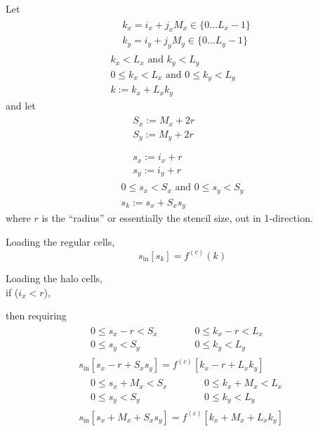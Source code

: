 \documentclass[10pt]{amsart}
\begin{document}
\begin{multicols*}{2}
Let
\[
\begin{gathered}
  \begin{aligned}
    & k_x = i_x + j_x M_x \in \lbrace 0 \dots L_x -1 \rbrace \\ 
    & k_y = i_y + j_y M_y \in \lbrace 0 \dots L_y -1 \rbrace 
    \end{aligned} \\
  k_x < L_x \text{ and } k_y < L_y \\
  0 \leq k_x < L_x \text{ and } 0 \leq k_y < L_y \\
  k := k_x + L_x k_y
\end{gathered}
\]
and let
\[
\begin{gathered}
  \begin{aligned}
    & S_x := M_x + 2r \\ 
    & S_y := M_y + 2r \\
    \end{aligned} \\
  \begin{aligned}
    & s_x := i_x + r \\ 
    & s_y := i_y + r
  \end{aligned} \\
  0 \leq s_x < S_x \text{ and } 0 \leq s_y < S_y \\
  s_k := s_x + S_x s_y 
\end{gathered}
\]
where $r$ is the ``radius'' or essentially the stencil size, out in 1-direction.

Loading the regular cells,
\[
s_{\text{in}}[s_k] = f^{(c)}(k)
\]

Loading the halo cells, \\

if ($i_x < r$),

then requiring
\[
\begin{gathered}
  \begin{aligned}
    & 0 \leq s_x -r < S_x \\ 
    & 0 \leq s_y < S_y
  \end{aligned} \quad \quad \,
  \begin{aligned}
    & 0 \leq k_x - r < L_x \\ 
    & 0 \leq k_y < L_y
    \end{aligned} \\
  s_{\text{in}}[s_x-r + S_xs_y] = f^{(c)}[k_x-r + L_x k_y] \\ 
   \begin{aligned}
    & 0 \leq s_x +M_x < S_x \\ 
    & 0 \leq s_y < S_y
  \end{aligned} \quad \quad \,
  \begin{aligned}
    & 0 \leq k_x + M_x < L_x \\ 
    & 0 \leq k_y < L_y
  \end{aligned} \\
  s_{\text{in}}[s_x + M_x + S_xs_y] = f^{(c)}[k_x + M_x + L_xk_y]
\end{gathered}
\]


\end{multicols*}
\end{document}
